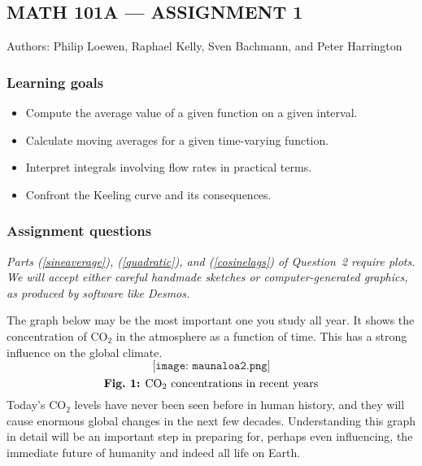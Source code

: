 \documentclass{exam}
\begin{document}
\subsection*{MATH 101A --- ASSIGNMENT 1}

Authors: Philip Loewen, Raphael Kelly, Sven Bachmann, and Peter Harrington

\subsubsection*{Learning goals}
\begin{itemize}
    \setlength\itemsep{0.1em}
    \item Compute the average value of a given function on a given interval.
    \item Calculate moving averages for a given time-varying function.
    \item Interpret integrals involving flow rates in practical terms.
    \item Confront the Keeling curve and its consequences.
\end{itemize}



\subsubsection*{Assignment questions}


\noindent
\textit{Parts (\ref{sineaverage}), (\ref{quadratic}), and (\ref{cosinelags}) of Question~2
require plots. We will accept either careful handmade sketches or 
computer-generated graphics, as produced by software like Desmos.}

\bigskip

\noindent
The graph below may be the most important one you study all year.
It shows the concentration of CO$_2$ in the atmosphere as a function of time.
This has a strong influence on the global climate.
\[
\texttt{[image: maunaloa2.png]}
\]
\[\text{\textbf{Fig.~1:} CO$_2$ concentrations in recent years}\]
Today's CO$_2$ levels have never been seen before in human history,
and they will cause enormous global changes in the next few decades.
Understanding this graph in detail will be an important step
in preparing for, perhaps even influencing,
the immediate future of humanity and indeed all life on Earth.
\end{document}
